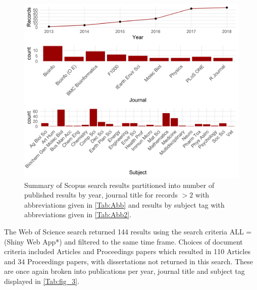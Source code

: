 \begin{figure}[ht]
	\centering
	\includegraphics[width=\linewidth]{3wayScopus.PNG}
	\caption{Summary of Scopus search results partitioned into number of published results by year, journal title for records \(> 2\) with abbreviations given in \autoref{Tab:Abb} and results by subject tag with abbreviations given in \autoref{Tab:Abb2}.}
	\label{Tab:fig_2}
\end{figure}

The Web of Science search returned 144 results using the search criteria ALL = (Shiny Web App*) and filtered to the same time frame.  Choices of document criteria included Articles and Proceedings papers which resulted in 110 Articles and 34 Proceedings papers, with dissertations not returned in this search.  These are once again broken into publications per year, journal title and subject tag displayed in \autoref{Tab:fig_3}.

